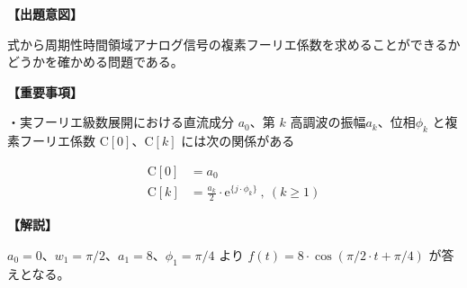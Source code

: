 \noindent \textbf{【出題意図】}

\bigskip
\noindent 式から周期性時間領域アナログ信号の複素フーリエ係数を求めることができるかどうかを確かめる問題である。

\vspace{1em}
\noindent \textbf{【重要事項】}

\medskip
\noindent・実フーリエ級数展開における直流成分 $a_0$、第 $k$ 高調波の振幅$a_k$、位相$\phi_k$ と複素フーリエ係数 $\textrm{C}[0]$、$\textrm{C}[k]$ には次の関係がある

\begin{align*}
\textrm{C}[0] &= a_0 \\
\textrm{C}[k] &= \frac{a_k}{2} \cdot \textrm{e}^{\{j \cdot \phi_k \}} \ ,\ (k\geq 1)
\end{align*}


\bigskip

\vspace{1em}
\noindent \textbf{【解説】}

\bigskip
\noindent $a_0 = 0$、$w_1 = \pi/2$、$a_1 = 8$、$\phi_1 = \pi/4$ より $f(t) = 8 \cdot \cos( \pi/2 \cdot t + \pi/4)$ が答えとなる。
